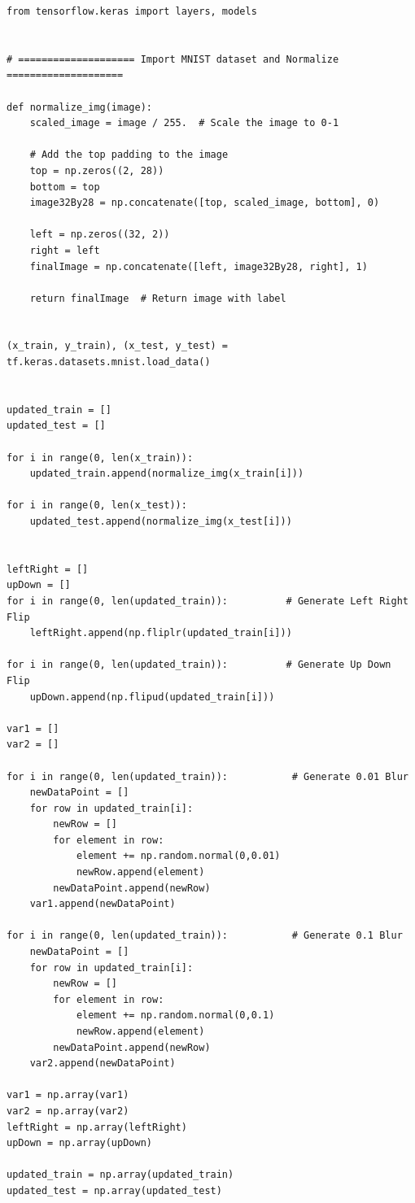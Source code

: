 \documentclass{article}
\begin{document}
\begin{titlepage}
\begin{lstlisting}
from tensorflow.keras import layers, models


# ==================== Import MNIST dataset and Normalize ====================

def normalize_img(image):
    scaled_image = image / 255.  # Scale the image to 0-1

    # Add the top padding to the image
    top = np.zeros((2, 28))
    bottom = top
    image32By28 = np.concatenate([top, scaled_image, bottom], 0)

    left = np.zeros((32, 2))
    right = left
    finalImage = np.concatenate([left, image32By28, right], 1)

    return finalImage  # Return image with label


(x_train, y_train), (x_test, y_test) = tf.keras.datasets.mnist.load_data()


updated_train = []
updated_test = []

for i in range(0, len(x_train)):
    updated_train.append(normalize_img(x_train[i]))

for i in range(0, len(x_test)):
    updated_test.append(normalize_img(x_test[i]))


leftRight = []
upDown = []
for i in range(0, len(updated_train)):          # Generate Left Right Flip
    leftRight.append(np.fliplr(updated_train[i]))

for i in range(0, len(updated_train)):          # Generate Up Down Flip
    upDown.append(np.flipud(updated_train[i]))

var1 = []
var2 = []

for i in range(0, len(updated_train)):           # Generate 0.01 Blur
    newDataPoint = []
    for row in updated_train[i]:
        newRow = []
        for element in row:
            element += np.random.normal(0,0.01)
            newRow.append(element)
        newDataPoint.append(newRow)
    var1.append(newDataPoint)

for i in range(0, len(updated_train)):           # Generate 0.1 Blur
    newDataPoint = []
    for row in updated_train[i]:
        newRow = []
        for element in row:
            element += np.random.normal(0,0.1)
            newRow.append(element)
        newDataPoint.append(newRow)
    var2.append(newDataPoint)

var1 = np.array(var1)
var2 = np.array(var2)
leftRight = np.array(leftRight)
upDown = np.array(upDown)

updated_train = np.array(updated_train)
updated_test = np.array(updated_test)


\end{lstlisting}
\end{titlepage}
\end{document}
